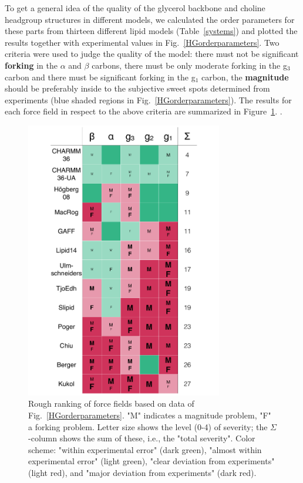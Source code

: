 \documentclass[pre,aps,floatfix,authordate1-4,twocolumn]{revtex4-1}
\begin{document}
To get a general idea of the quality of the glycerol backbone and choline headgroup structures in different models, we calculated 
the order parameters for these parts from thirteen different lipid models (Table~\ref{systems}) and 
plotted the results together with experimental values in Fig.~\ref{HGorderparameters}.
Two criteria were used to judge the quality of the model: there must not be significant  {\bf forking} in the $\alpha$ and $\beta$ carbons,
there must be only moderate forking in the g$_3$ carbon and there must be significant forking in the g$_1$ carbon, the {\bf magnitude}
should be preferably inside to the subjective sweet spots determined from experiments (blue shaded regions in Fig.~\ref{HGorderparameters}).
The results for each force field in respect to the above criteria are summarized in Figure~\ref{FullHydrationComparisonTable}.
.
\begin{figure}[]
  \centering
  \includegraphics[width=8.6cm]{../DATAreportediINblog/comparisonTable.pdf}
  \caption{\label{FullHydrationComparisonTable}
  Rough ranking of force fields based on data of Fig.~\ref{HGorderparameters}.
  "M" indicates a magnitude problem,
  "F" a forking problem.
  Letter size shows the level (0-4) of severity;
  the $\Sigma$-column shows the sum of these, i.e., the "total severity".
  Color scheme:
  "within experimental error" (dark green),
  "almost within experimental error" (light green),
  "clear deviation from experiments" (light red), and
  "major deviation from experiments" (dark red).
  } 
\end{figure}
\end{document}
